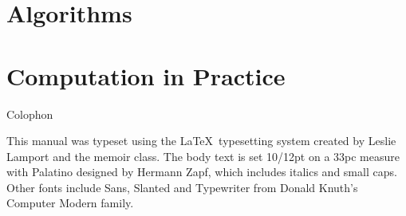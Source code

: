 \documentclass[letterpaper,10pt,extrafontsizesmtwoside,onecolumn,openright,fleqn]{memoir}
\begin{document}






\part{Algorithms}










\part{Computation in Practice}







\backmatter

\cleardoublepage
{}
{}
\printindex

\cleardoublepage
\pagestyle{empty}
\null\vfil

\begin{adjustwidth}{1in}{1in}
\begin{center}
{\Large\textsf{Colophon}}
\end{center}
\begin{center}
This manual was typeset using the \LaTeX\ typesetting system
created by Leslie Lamport and the memoir class.
The body text is set 10/12pt on a
33pc measure with Palatino designed by Hermann Zapf, which includes
italics and small caps. Other fonts include
Sans, Slanted and Typewriter from Donald Knuth's
Computer Modern family.

\end{center}

\end{adjustwidth}

\vfil
\end{document}
